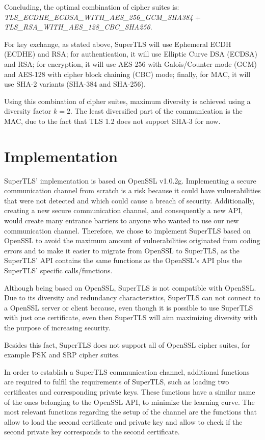 \documentclass{sig-alternate-05-2015}
\begin{document}
Concluding, the optimal combination of cipher suites is:\\
\textit{TLS\_ECDHE\_ECDSA\_WITH\_AES\_256\_GCM\_SHA384} + \\\textit{TLS\_RSA\_WITH\_AES\_128\_CBC\_SHA256}.

For key exchange, as stated above, SuperTLS will use Ephemeral ECDH (ECDHE) and RSA; for authentication, it will use Elliptic Curve DSA (ECDSA) and RSA; for encryption, it will use AES-256 with Galois/Counter mode (GCM) and AES-128 with cipher block chaining (CBC) mode; finally, for MAC, it will use SHA-2 variants (SHA-384 and SHA-256).

Using this combination of cipher suites, maximum diversity is achieved using a diversity factor $k = 2$. The least diversified part of the communication is the MAC, due to the fact that TLS 1.2 does not support SHA-3 for now.

\section{Implementation}

SuperTLS' implementation is based on OpenSSL v1.0.2g. Implementing a secure communication channel from scratch is a risk because it could have vulnerabilities that were not detected and which could cause a breach of security. Additionally, creating a new secure communication channel, and consequently a new API, would create many entrance barriers to anyone who wanted to use our new communication channel. Therefore, we chose to implement SuperTLS based on OpenSSL to avoid the maximum amount of vulnerabilities originated from coding errors and to make it easier to migrate from OpenSSL to SuperTLS, as the SuperTLS' API contains the same functions as the OpenSSL's API plus the SuperTLS' specific calls/functions.

Although being based on OpenSSL, SuperTLS is not compatible with OpenSSL. Due to its diversity and redundancy characteristics, SuperTLS can not connect to a OpenSSL server or client because, even though it is possible to use SuperTLS with just one certificate, even then SuperTLS will aim maximizing diversity with the purpose of increasing security.

Besides this fact, SuperTLS does not support all of OpenSSL cipher suites, for example PSK and SRP cipher suites.

In order to establish a SuperTLS communication channel, additional functions are required to fulfil the requirements of SuperTLS, such as loading two certificates and corresponding private keys. These functions have a similar name of the ones belonging to the OpenSSL API, to minimize the learning curve.
The most relevant functions regarding the setup of the channel are the functions that allow to load the second certificate and private key and allow to check if the second private key corresponds to the second certificate.
\end{document}
